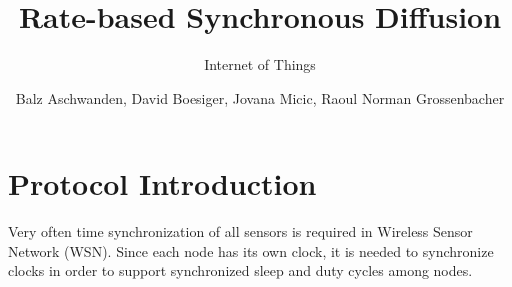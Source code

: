 \documentclass{llncs}
\begin{document}
\title{Rate-based Synchronous Diffusion}


\subtitle{Internet of Things}


\author{Balz Aschwanden, David Boesiger, Jovana Micic,  Raoul Norman Grossenbacher} 








\maketitle

\section{Protocol Introduction}
Very often time synchronization of all sensors is required in Wireless Sensor Network (WSN). Since each node has its own clock, it is  needed to synchronize clocks in order to support synchronized sleep and duty cycles among nodes.
\end{document}
